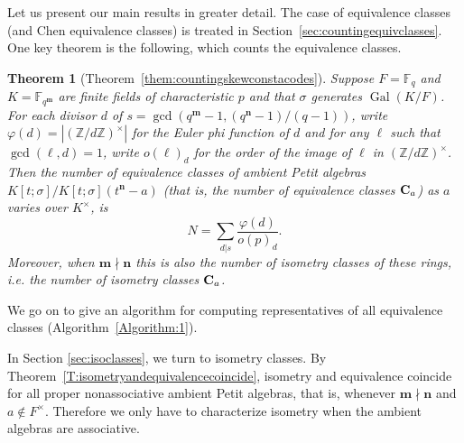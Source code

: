 \documentclass[11pt]{amsart}
\theoremstyle{plain}
\newtheorem*{theorem*}{Theorem}
\theoremstyle{definition}
\numberwithin{equation}{section}
\numberwithin{figure}{section}
\newcommand{\FF}{\mathbb{F}}
\newcommand{\Kone}[1]{K[t;\sigma]/K[t;\sigma](t^{\de}-#1)}
\DeclareMathOperator{\id}{id}
\newcommand{\os}{{\mathbf{m}}}  %
\newcommand{\de}{{\mathbf{n}}}  %
\newcommand{\Z}{\mathbb{Z}} %
\DeclareMathOperator{\Gal}{Gal}
\begin{document}





Let us present our main results in greater detail.  The case of equivalence classes (and Chen equivalence classes) is treated in Section~\ref{sec:countingequivclasses}.  One key theorem is the following, which counts the equivalence classes.

\begin{theorem*}[Theorem~\ref{them:countingskewconstacodes}]
Suppose $F=\FF_{q}$ and $K=\FF_{q^\os}$ are finite fields of characteristic $p$ and that $\sigma$ generates $\Gal(K/F)$.  For each divisor $d$ of $s=\gcd(q^\os-1, (q^\de-1)/(q-1))$, write $\varphi(d)=|(\Z/d\Z)^\times|$ for the Euler phi function of $d$ and for any $\ell$ such that $\gcd(\ell,d)=1$, write $o(\ell)_d$ for the order of the image of $\ell$ in $(\Z/d\Z)^\times$.
  Then the number of equivalence classes of ambient Petit algebras $\Kone{a}$  (that is, the number of  equivalence classes  ${\bf C}_a$) as $a$ varies over $K^\times$,
  is
    $$
   N= \sum_{d|s}\frac{\varphi(d)}{o(p)_d}.
    $$
Moreover, when $\os \nmid\de$ this is also the number of \emph{isometry} classes  of these rings, i.e. the number of  \emph{isometry} classes  ${\bf C}_a$.
\end{theorem*}

 We go on to give an algorithm for computing representatives of all equivalence classes (Algorithm~\ref{Algorithm:1}).

 In Section \ref{sec:isoclasses}, we turn to isometry classes.
By Theorem~\ref{T:isometryandequivalencecoincide},
 isometry and equivalence coincide for all proper nonassociative ambient Petit algebras, that is, whenever $\os\nmid \de$ and $a \notin F^\times$.  Therefore we only have to characterize isometry when the ambient algebras are associative.
\end{document}
